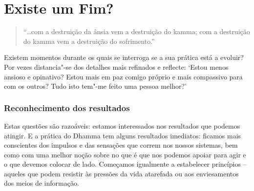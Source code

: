 
\chapter{Existe um Fim?}


\begin{quote}
  ``\ldots{}com a destruição da ânsia vem a destruição do kamma; com a
  destruição do kamma vem a destruição do sofrimento.''

\end{quote}

Existem momentos durante os quais se interroga se a sua prática está a evoluir?
Por vezes distancia"-se dos detalhes mais refinados e reflecte: `Estou menos
ansioso e opinativo? Estou mais em paz comigo próprio e mais compassivo para com
os outros? Tudo isto tem"-me feito uma pessoa melhor?'

\subsection{Reconhecimento dos resultados}

Estas questões são razoáveis: estamos interessados nos resultados que podemos
atingir. E a prática do Dhamma tem alguns resultados imediatos: ficamos mais
conscientes dos impulsos e das sensações que correm nos nossos sistemas, bem
como com uma melhor noção sobre no que é que nos podemos apoiar para agir e o
que devemos colocar de lado. Começamos igualmente a estabelecer princípios --
aqueles que podem resistir às pressões da vida atarefada ou aos enviesamentos
dos meios de informação.


